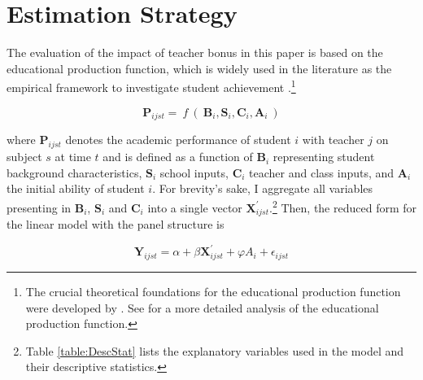 \documentclass[a4paper, 12pt]{article}
\begin{document}



\section{Estimation Strategy} \label{Paper3-Methodology}


The evaluation of the impact of teacher bonus in this paper is based on the educational production function, which is widely used in the literature as the empirical framework to investigate student achievement \citep{hanushek2012distribution}.\footnote{The crucial theoretical foundations for the educational production function were developed by \citet{hanushek1971teacher, hanushek1979conceptual, summers1977schools, boardman1979using, margo1986educational}. See \citet{hanushek2008education, todd2003specification, hanushek2002publicly, pritchett1999education} for a more detailed analysis of the educational production function.} 



\begin{equation} \label{eq:ProdFunction}
\mathbf{P}_{ijst} = \:f\:( \: \mathbf{B}_i, \mathbf{S}_i, \mathbf{C}_i, \mathbf{A}_{i} \:)
\end{equation}


where $\mathbf{P}_{ijst}$ denotes the academic performance of student $i$ with teacher $j$ on subject $s$ at time $t$ and is defined as a function of $\mathbf{B}_i$ representing student background characteristics, $\mathbf{S}_i$ school inputs, $\mathbf{C}_i$ teacher and class inputs, and $\mathbf{A}_{i}$ the initial ability of student $i$. For brevity's sake, I aggregate all variables presenting in $\mathbf{B}_i$, $\mathbf{S}_i$ and $\mathbf{C}_i$ into a single vector $\mathbf{X}_{ijst}^{\prime}$.\footnote{Table \ref{table:DescStat} lists the explanatory variables used in the model and their descriptive statistics.} Then, the reduced form for the linear model with the panel structure is


\begin{equation} \label{eq:BaseEPF}
\mathbf{Y}_{ijst} = \alpha + \beta\mathbf{X}_{ijst}^{\prime} + \varphi A_{i} + \epsilon_{ijst}  
\end{equation}
\end{document}
